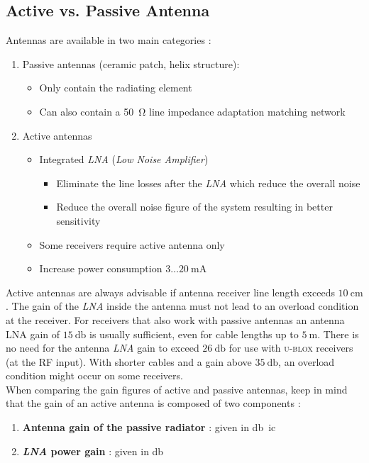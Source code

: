 \documentclass[report.tex]{subfiles}
\begin{document}
\subsection{Active vs. Passive Antenna}

Antennas are available in two main categories :
\begin{enumerate}
\item Passive antennas (ceramic patch, helix structure): 
\begin{itemize}
\item Only contain the radiating element
\item Can also contain a \SI{50}{\ohm} line impedance adaptation matching network
\end{itemize}
\pagebreak
\item Active antennas
\begin{itemize}
\item Integrated \textit{LNA} (\textit{Low Noise Amplifier})
\begin{itemize}
\item Eliminate the line losses after the \textit{LNA} which reduce the overall noise
\item Reduce the overall noise figure of the system resulting in better sensitivity
\end{itemize} 
\item Some receivers require active antenna only
\item Increase power consumption $\boxed{3 \ldots \SI{20}{\milli\ampere}}$\\
\end{itemize}
\end{enumerate}

Active antennas are always advisable if antenna receiver line length exceeds $\boxed{\SI{10}{\centi\meter}}$. The gain of the \textit{LNA} inside the antenna must not lead to an overload condition at the receiver. For receivers that also work with passive antennas an antenna LNA gain of $\boxed{\SI{15}{\decibel}}$ is usually sufficient, even for cable lengths up to $\SI{5}{\meter}$. There is no need for the antenna \textit{LNA} gain to exceed $\boxed{\SI{26}{\decibel}}$ for use with \textsc{u-blox} receivers (at the RF input). With shorter cables and a gain above $\boxed{\SI{35}{\decibel}}$, an overload condition might occur on some receivers.\\

When comparing the gain figures of active and passive antennas, keep in mind that the gain of an
active antenna is composed of two components :
\begin{enumerate}
\item \textbf{Antenna gain of the passive radiator} : given in \si{\decibel ic}
\item \textbf{\textit{LNA} power gain} : given in \si{\decibel}\\
\end{enumerate}
\end{document}
